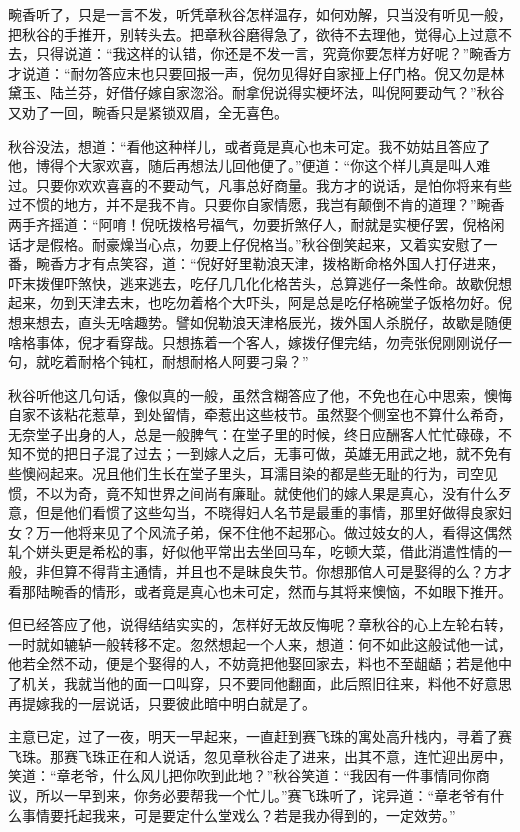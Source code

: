 \documentclass[12pt,UTF8]{ctexbook}
\begin{document}
{{{畹香听了，只是一言不发，听凭章秋谷怎样温存，如何劝解，只当没有听见一般，把秋谷的手推开，别转头去。把章秋谷磨得急了，欲待不去理他，觉得心上过意不去，只得说道：“我这样的认错，你还是不发一言，究竟你要怎样方好呢？”畹香方才说道：“耐勿答应末也只要回报一声，倪勿见得好自家挜上仔门格。倪又勿是林黛玉、陆兰芬，好借仔嫁自家淴浴。耐拿倪说得实梗坏法，叫倪阿要动气？”秋谷又劝了一回，畹香只是紧锁双眉，全无喜色。

秋谷没法，想道：“看他这种样儿，或者竟是真心也未可定。我不妨姑且答应了他，博得个大家欢喜，随后再想法儿回他便了。”便道：“你这个样儿真是叫人难过。只要你欢欢喜喜的不要动气，凡事总好商量。我方才的说话，是怕你将来有些过不惯的地方，并不是我不肯。只要你自家情愿，我岂有颠倒不肯的道理？”畹香两手齐摇道：“阿唷！倪呒拨格号福气，勿要折煞仔人，耐就是实梗仔罢，倪格闲话才是假格。耐豪燥当心点，勿要上仔倪格当。”秋谷倒笑起来，又着实安慰了一番，畹香方才有点笑容，道：“倪好好里勒浪天津，拨格断命格外国人打仔进来，吓末拨俚吓煞快，逃来逃去，吃仔几几化化格苦头，总算逃仔一条性命。故歇倪想起来，勿到天津去末，也吃勿着格个大吓头，阿是总是吃仔格碗堂子饭格勿好。倪想来想去，直头无啥趣势。譬如倪勒浪天津格辰光，拨外国人杀脱仔，故歇是随便啥格事体，倪才看穿哉。只想拣着一个客人，嫁拨仔俚完结，勿壳张倪刚刚说仔一句，就吃着耐格个钝杠，耐想耐格人阿要刁枭？”

秋谷听他这几句话，像似真的一般，虽然含糊答应了他，不免也在心中思索，懊悔自家不该粘花惹草，到处留情，牵惹出这些枝节。虽然娶个侧室也不算什么希奇，无奈堂子出身的人，总是一般脾气：在堂子里的时候，终日应酬客人忙忙碌碌，不知不觉的把日子混了过去；一到嫁人之后，无事可做，英雄无用武之地，就不免有些懊闷起来。况且他们生长在堂子里头，耳濡目染的都是些无耻的行为，司空见惯，不以为奇，竟不知世界之间尚有廉耻。就使他们的嫁人果是真心，没有什么歹意，但是他们看惯了这些勾当，不晓得妇人名节是最重的事情，那里好做得良家妇女？万一他将来见了个风流子弟，保不住他不起邪心。做过妓女的人，看得这偶然轧个姘头更是希松的事，好似他平常出去坐回马车，吃顿大菜，借此消遣性情的一般，非但算不得背主通情，并且也不是昧良失节。你想那倌人可是娶得的么？方才看那陆畹香的情形，或者竟是真心也未可定，然而与其将来懊恼，不如眼下推开。

但已经答应了他，说得结结实实的，怎样好无故反悔呢？章秋谷的心上左轮右转，一时就如辘轳一般转移不定。忽然想起一个人来，想道：何不如此这般试他一试，他若全然不动，便是个娶得的人，不妨竟把他娶回家去，料也不至龃龉；若是他中了机关，我就当他的面一口叫穿，只不要同他翻面，此后照旧往来，料他不好意思再提嫁我的一层说话，只要彼此暗中明白就是了。

主意已定，过了一夜，明天一早起来，一直赶到赛飞珠的寓处高升栈内，寻着了赛飞珠。那赛飞珠正在和人说话，忽见章秋谷走了进来，出其不意，连忙迎出房中，笑道：“章老爷，什么风儿把你吹到此地？”秋谷笑道：“我因有一件事情同你商议，所以一早到来，你务必要帮我一个忙儿。”赛飞珠听了，诧异道：“章老爷有什么事情要托起我来，可是要定什么堂戏么？若是我办得到的，一定效劳。”

}}}
\end{document}
